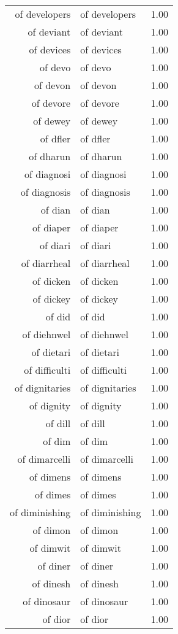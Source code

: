 \begin{table}[ht]
\begin{tabular}{rlr}
  of developers & of developers & 1.00 \\ 
  of deviant & of deviant & 1.00 \\ 
  of devices & of devices & 1.00 \\ 
  of devo & of devo & 1.00 \\ 
  of devon & of devon & 1.00 \\ 
  of devore & of devore & 1.00 \\ 
  of dewey & of dewey & 1.00 \\ 
  of dfler & of dfler & 1.00 \\ 
  of dharun & of dharun & 1.00 \\ 
  of diagnosi & of diagnosi & 1.00 \\ 
  of diagnosis & of diagnosis & 1.00 \\ 
  of dian & of dian & 1.00 \\ 
  of diaper & of diaper & 1.00 \\ 
  of diari & of diari & 1.00 \\ 
  of diarrheal & of diarrheal & 1.00 \\ 
  of dicken & of dicken & 1.00 \\ 
  of dickey & of dickey & 1.00 \\ 
  of did & of did & 1.00 \\ 
  of diehnwel & of diehnwel & 1.00 \\ 
  of dietari & of dietari & 1.00 \\ 
  of difficulti & of difficulti & 1.00 \\ 
  of dignitaries & of dignitaries & 1.00 \\ 
  of dignity & of dignity & 1.00 \\ 
  of dill & of dill & 1.00 \\ 
  of dim & of dim & 1.00 \\ 
  of dimarcelli & of dimarcelli & 1.00 \\ 
  of dimens & of dimens & 1.00 \\ 
  of dimes & of dimes & 1.00 \\ 
  of diminishing & of diminishing & 1.00 \\ 
  of dimon & of dimon & 1.00 \\ 
  of dimwit & of dimwit & 1.00 \\ 
  of diner & of diner & 1.00 \\ 
  of dinesh & of dinesh & 1.00 \\ 
  of dinosaur & of dinosaur & 1.00 \\ 
  of dior & of dior & 1.00 \\ 

\end{tabular}
\end{table}
